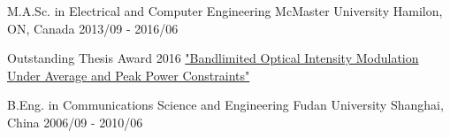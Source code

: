 


\begin{cventries}

\cventry
{M.A.Sc. in Electrical and Computer Engineering} %
{McMaster University} %
{Hamilon, ON, Canada} %
{2013/09 - 2016/06} %
{ %
\begin{cvitems}
	\item {Outstanding Thesis Award 2016} \href{https://macsphere.mcmaster.ca/handle/11375/19134}{"Bandlimited Optical Intensity Modulation Under Average and Peak Power Constraints"}
\end{cvitems}
}


\cventry
{B.Eng. in Communications Science and Engineering}
{Fudan University}
{Shanghai, China}
{2006/09 - 2010/06}
{}

\end{cventries}